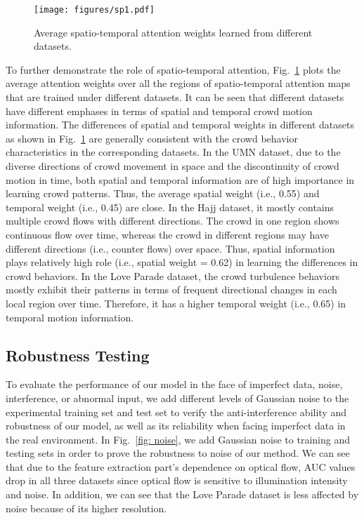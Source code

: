 \documentclass[journal]{IEEEtran}
\begin{document}
\begin{figure}[t] %
\centering
\texttt{[image: figures/sp1.pdf]}
\caption{
 Average spatio-temporal attention weights learned from different datasets.}
\label{sp}
\end{figure}

To further demonstrate the role of spatio-temporal attention, Fig.~\ref{sp} plots the average attention weights over all the regions of spatio-temporal attention maps that are trained under different datasets. It can be seen that different datasets have different emphases in terms of spatial and temporal crowd motion information. The differences of spatial and temporal weights in different datasets as shown in Fig.~\ref{sp} are generally consistent with the crowd behavior characteristics in the corresponding datasets. In the UMN dataset, due to the diverse directions of crowd movement in space and the discontinuity of crowd motion in time, both spatial and temporal information are of high importance in learning crowd patterns. Thus, the average spatial weight (i.e., 0.55) and temporal weight (i.e., 0.45) are close. In the Hajj dataset, it mostly contains multiple crowd flows with different directions. The crowd in one region shows continuous flow over time, whereas the crowd in different regions may have different directions (i.e., counter flows) over space. Thus, spatial information plays relatively high role (i.e., spatial weight = 0.62) in learning the differences in crowd behaviors. In the Love Parade dataset, the crowd turbulence behaviors mostly exhibit their patterns in terms of frequent directional changes in each local region over time. Therefore, it has a higher temporal weight (i.e., 0.65) in temporal motion information.

\subsection{Robustness Testing}

To evaluate the performance of our model in the face of imperfect data, noise, interference, or abnormal input, we add different levels of Gaussian noise to the experimental training set and test set to verify the anti-interference ability and robustness of our model, as well as its reliability when facing imperfect data in the real environment. In Fig.~\ref{fig: noise}, we add Gaussian noise to training and testing sets in order to prove the robustness to noise of our method.
We can see that due to the feature extraction part's dependence on optical flow, AUC values drop in all three datasets since optical flow is sensitive to illumination intensity and noise. In addition, we can see that the  Love Parade dataset is less affected by noise because of its higher resolution.
\end{document}
